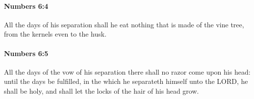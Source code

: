 		\paragraph{Numbers 6:4} %
			\label{NUMBERS-6-4}

			All the days of his separation shall he eat nothing that is made of the vine tree, from the kernels even to the husk.


		\paragraph{Numbers 6:5} %
			\label{NUMBERS-6-5}

			All the days of the vow of his separation there shall no razor come upon his head: until the days be fulfilled, in the which he separateth himself unto the LORD, he shall be holy, and shall let the locks of the hair of his head grow.


